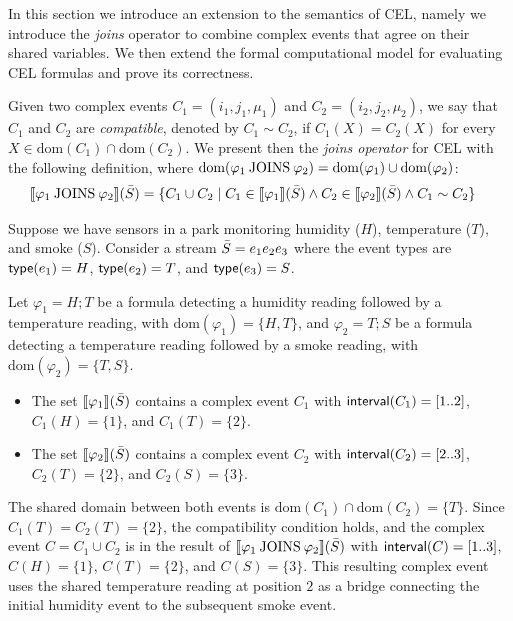 In this section we introduce an extension to the semantics of CEL, namely we introduce the \textit{joins} operator to combine complex events that agree on their shared variables. 
We then extend the formal computational model for evaluating CEL formulas and prove its correctness. 

Given two complex events $C_1 = (i_1, j_1, \mu_1)$ and $C_2 = (i_2, j_2, \mu_2)$, we say that $C_1$ and $C_2$ are \emph{compatible}, denoted by $C_1 \sim C_2$, if $C_1(X) = C_2(X)$ for every $X \in \text{dom}(C_1) \cap \text{dom}(C_2)$. We present then the \emph{joins operator} for CEL with the following definition, where $\text{dom}(\varphi_1 \mathbin{\text{JOINS}} \varphi_2) = \text{dom}(\varphi_1) \cup \text{dom}(\varphi_2)$:
\[ 
\begin{aligned}
	\sem{\varphi_1 \joins \varphi_2}(\Stream)
	&= \{C_1 \cup C_2 \mid C_1 \in \sem{\varphi_1}(\Stream) 
	\land C_2 \in \sem{\varphi_2}(\Stream) 
	\land C_1 \sim C_2\}
\end{aligned}
\]

\begin{example} Suppose we have sensors in a park monitoring humidity ($H$), temperature ($T$), and smoke ($S$). Consider a stream $\bar{S} = e_1 e_2 e_3$ where the event types are $\mathsf{type}(e_1) = H$, $\mathsf{type}(e_2) = T$, and $\mathsf{type}(e_3) = S$. 
	
	Let $\varphi_1 = H ; T$ be a formula detecting a humidity reading followed by a temperature reading, with $\text{dom}(\varphi_1) = \{H, T\}$, and $\varphi_2 = T ; S$ be a formula detecting a temperature reading followed by a smoke reading, with $\text{dom}(\varphi_2) = \{T, S\}$.
	\begin{itemize}
		\item The set $\sem{\varphi_1}(\Stream)$ contains a complex event $C_1$ with $\mathsf{interval}(C_1) = [1..2]$, $C_1(H) = \{1\}$, and $C_1(T) = \{2\}$.
		\item The set $\sem{\varphi_2}(\Stream)$ contains a complex event $C_2$ with $\mathsf{interval}(C_2) = [2..3]$, $C_2(T) = \{2\}$, and $C_2(S) = \{3\}$.
	\end{itemize}
	
	The shared domain between both events is $\text{dom}(C_1) \cap \text{dom}(C_2) = \{T\}$. Since $C_1(T) = C_2(T) = \{2\}$, the compatibility condition holds, and the complex event $C = C_1 \cup C_2$ is in the result of $\sem{\varphi_1 \joins \varphi_2}(\Stream)$ with $\mathsf{interval}(C) = [1..3]$, $C(H) = \{1\}$, $C(T) = \{2\}$, and $C(S) = \{3\}$. This resulting complex event uses the shared temperature reading at position $2$ as a bridge connecting the initial humidity event to the subsequent smoke event.
\end{example}


